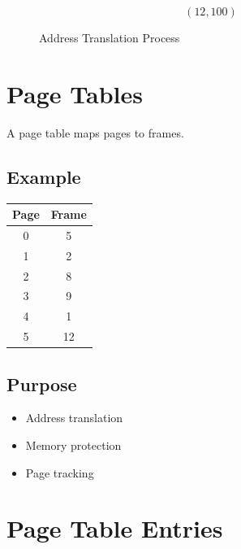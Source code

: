 \[
(12,100)
\]

\begin{figure}[H]
\centering
{}
\caption{Address Translation Process}
\end{figure}

\section{Page Tables}

A page table maps pages to frames.

\subsection{Example}

\begin{center}
\begin{tabular}{cc}
\toprule
Page & Frame \\
\midrule
0 & 5 \\
1 & 2 \\
2 & 8 \\
3 & 9 \\
4 & 1 \\
5 & 12 \\
\bottomrule
\end{tabular}
\end{center}

\subsection{Purpose}

\begin{itemize}
\item Address translation
\item Memory protection
\item Page tracking
\end{itemize}

\section{Page Table Entries}

